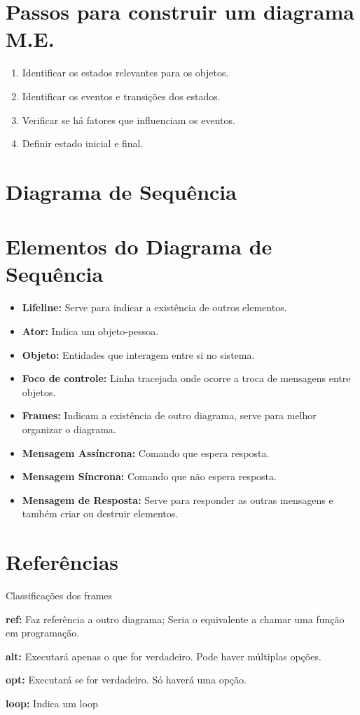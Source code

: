 \documentclass[12pt, a4paper]{article}
\newcommand{\cvsection}[1]{\section*{\rmfamily#1}}
\begin{document}
\newpage

\indent
\cvsection{Passos para construir um diagrama M.E.}

{\Large
\begin{enumerate}[label=\textbf{\arabic*}º]
    \item Identificar os estados relevantes para os objetos.
    \item Identificar os eventos e transições dos estados.
    \item Verificar se há fatores que influenciam os eventos.
    \item Definir estado inicial e final.
\end{enumerate}
}

\indent
\section{Diagrama de Sequência}

\indent
\cvsection{Elementos do Diagrama de Sequência}

{\Large
\begin{itemize}
    \item \textbf{Lifeline:} Serve para indicar a existência de outros elementos.
    \item \textbf{Ator:} Indica um objeto-pessoa.
    \item \textbf{Objeto:} Entidades que interagem entre si no sistema.
    \item \textbf{Foco de controle:} Linha tracejada onde ocorre a troca de mensagens
    entre objetos.
    \item \textbf{Frames:} Indicam a existência de outro diagrama, serve para melhor
    organizar o diagrama.
    \item \textbf{Mensagem Assíncrona:} Comando que espera resposta.
    \item \textbf{Mensagem Síncrona:} Comando que não espera resposta.
    \item \textbf{Mensagem de Resposta:} Serve para responder as outras mensagens e também
    criar ou destruir elementos. 
\end{itemize}
}

\newpage

\indent
\cvsection{Referências}

{\Large
\hspace{1em}Classificações dos frames
\begin{description}
    \item \textbf{ref:} Faz referência a outro diagrama; Seria o equivalente
    a chamar uma função em programação.
    \item \textbf{alt:} Executará apenas o que for verdadeiro. Pode haver 
    múltiplas opções.
    \item \textbf{opt:} Executará se for verdadeiro. Só haverá uma opção.
    \item \textbf{loop:} Indica um loop
\end{description}
}
\end{document}
